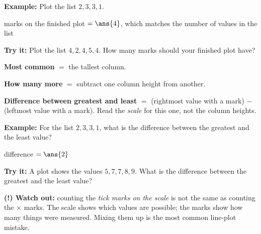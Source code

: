 \documentclass[12pt]{article}
\begin{document}
\begin{examplebox}
\textbf{Example:} \quad Plot the list $2, 3, 3, 1$.

marks on the finished plot $= \ans{4}$, which matches the number of values in the list
\end{examplebox}

\begin{tryitbox}
\textbf{Try it:} \quad Plot the list $4, 2, 4, 5, 4$. How many marks should your finished plot have?\\[2pt]
\end{tryitbox}


\begin{formulabox}
\textbf{Most common} $=$ the tallest column.\par
\textbf{How many more} $=$ subtract one column height from another.\par
\textbf{Difference between greatest and least} $=$ (rightmost value with a mark) $-$ (leftmost value
with a mark). Read the \emph{scale} for this one, not the column heights.
\end{formulabox}

\begin{examplebox}
\textbf{Example:} \quad For the list $2, 3, 3, 1$, what is the difference between the greatest and the
least value?

difference $= \ans{2}$
\end{examplebox}

\begin{tryitbox}
\textbf{Try it:} \quad A plot shows the values $5, 7, 7, 8, 9$. What is the difference between the
greatest and the least value?\\[2pt]
\end{tryitbox}

\begin{watchoutbox}
\textbf{(!) Watch out:} counting the \emph{tick marks on the scale} is not the same as counting the
$\times$ marks. The scale shows which values are possible; the marks show how many things were
measured. Mixing them up is the most common line-plot mistake.
\end{watchoutbox}
\end{document}

